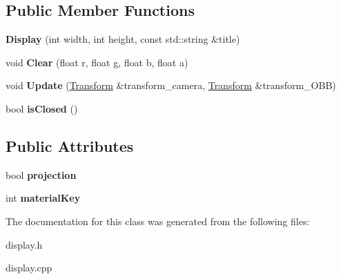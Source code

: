 \subsection*{Public Member Functions}
\begin{DoxyCompactItemize}
\item 
{\bfseries Display} (int width, int height, const std\+::string \&title)\hypertarget{class_display_a87a6f6c52cfc4ba3be9ad262ab3d45a5}{}\label{class_display_a87a6f6c52cfc4ba3be9ad262ab3d45a5}

\item 
void {\bfseries Clear} (float r, float g, float b, float a)\hypertarget{class_display_a8681db3f75e07bc3df838c0a33de8472}{}\label{class_display_a8681db3f75e07bc3df838c0a33de8472}

\item 
void {\bfseries Update} (\hyperlink{class_transform}{Transform} \&transform\+\_\+camera, \hyperlink{class_transform}{Transform} \&transform\+\_\+\+O\+BB)\hypertarget{class_display_ab872805f73a9521c7e4e646404d8a0b4}{}\label{class_display_ab872805f73a9521c7e4e646404d8a0b4}

\item 
bool {\bfseries is\+Closed} ()\hypertarget{class_display_ad72eae29139375a697766d9fb1450a38}{}\label{class_display_ad72eae29139375a697766d9fb1450a38}

\end{DoxyCompactItemize}
\subsection*{Public Attributes}
\begin{DoxyCompactItemize}
\item 
bool {\bfseries projection}\hypertarget{class_display_a9167af31dc8fc8771c9c202d428f6196}{}\label{class_display_a9167af31dc8fc8771c9c202d428f6196}

\item 
int {\bfseries material\+Key}\hypertarget{class_display_a6ad25732b6e448b26b04bafec5930b7e}{}\label{class_display_a6ad25732b6e448b26b04bafec5930b7e}

\end{DoxyCompactItemize}


The documentation for this class was generated from the following files\+:\begin{DoxyCompactItemize}
\item 
display.\+h\item 
display.\+cpp\end{DoxyCompactItemize}
